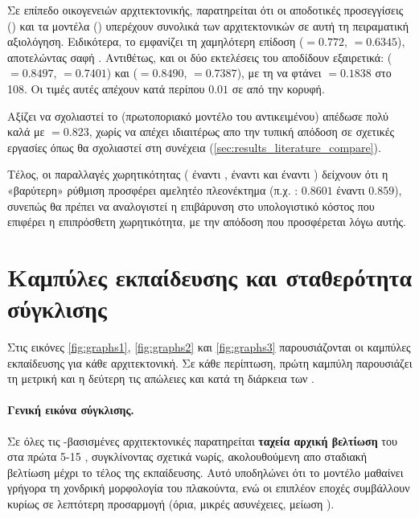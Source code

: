 Σε επίπεδο οικογενειών αρχιτεκτονικής, παρατηρείται ότι οι αποδοτικές
 προσεγγίσεις () και τα 
μοντέλα () υπερέχουν συνολικά των 
αρχιτεκτονικών σε αυτή τη πειραματική αξιολόγηση. Ειδικότερα, το
 εμφανίζει τη χαμηλότερη επίδοση ($=0.772$,
$=0.6345$), αποτελώντας σαφή
. 
Αντιθέτως, και οι δύο εκτελέσεις του  αποδίδουν εξαιρετικά:
 ($=0.8497$, $=0.7401$) και
 ($=0.8490$, $=0.7387$), με τη
 να φτάνει $=0.1838$ στο  108.
Οι τιμές αυτές απέχουν κατά περίπου $0.01$ σε  από την κορυφή.

Αξίζει να σχολιαστεί το  (πρωτοποριακό μοντέλο του αντικειμένου) απέδωσε πολύ καλά με 
$= 0.823$, χωρίς να απέχει ιδιαιτέρως απο την τυπική απόδοση σε σχετικές εργασίες όπως θα σχολιαστεί στη συνέχεια (\ref{sec:results_literature_compare}).

Τέλος, οι παραλλαγές χωρητικότητας ( έναντι ,
 έναντι  και 
έναντι ) δείχνουν ότι η «βαρύτερη» ρύθμιση προσφέρει
αμελητέο πλεονέκτημα (π.χ. : $0.8601$ έναντι $0.859$), συνεπώς 
θα πρέπει να αναλογιστεί η επιβάρυνση στο υπολογιστικό κόστος που επιφέρει η 
επιπρόσθετη χωρητικότητα, με την απόδοση που προσφέρεται λόγω αυτής. 

\section{Καμπύλες εκπαίδευσης και σταθερότητα σύγκλισης}
\label{sec:results_curves}
Στις εικόνες \ref{fig:graphs1}, \ref{fig:graphs2} και \ref{fig:graphs3} παρουσιάζονται οι καμπύλες 
εκπαίδευσης για κάθε αρχιτεκτονική. Σε κάθε περίπτωση, 
πρώτη καμπύλη παρουσιάζει τη μετρική  και η δεύτερη τις απώλειες  και 
 κατά τη διάρκεια των .


\paragraph{Γενική εικόνα σύγκλισης.}
Σε όλες τις -βασισμένες αρχιτεκτονικές παρατηρείται \textbf{ταχεία αρχική βελτίωση} του  στα πρώτα 5-15 ,
συγκλίνοντας σχετικά νωρίς, ακολουθούμενη απο σταδιακή βελτίωση μέχρι το τέλος της εκπαίδευσης. 
Αυτό υποδηλώνει ότι το μοντέλο μαθαίνει γρήγορα τη χονδρική μορφολογία του πλακούντα, ενώ οι επιπλέον εποχές συμβάλλουν κυρίως σε λεπτότερη προσαρμογή (όρια, μικρές ασυνέχειες, μείωση ).

